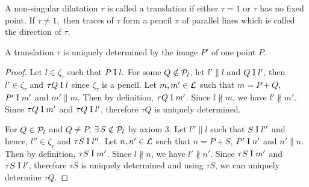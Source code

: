 \begin{definition}
    A non-singular dilatation $\tau$ is called a translation if either $\tau = 1$ or $\tau$ has no fixed point. If $\tau \neq 1,$ then traces of $\tau$ form a pencil $\pi$ of parallel lines which is called the direction of $\tau.$
\end{definition}

\begin{theorem}
    A translation $\tau$ is uniquely determined by the image $P'$ of one point $P.$
\end{theorem}

\begin{proof}
    Let $l \in \zeta_\tau$ such that $P \mathrel\text{I} l.$ For some $Q \notin \mathcal{P}_l$, let $l' \parallel l$ and $Q \mathrel\text{I} l'$, then $l' \in \zeta_\tau$ and $\tau Q \mathrel\text{I} l$ since $\zeta_\tau$ is a pencil.  Let $m,m' \in \mathcal{L}$ such that $m=P+Q$, $P' \mathrel\text{I} m'$ and $m' \parallel m$. Then by definition, $ \tau Q \mathrel\text{I} m'$. Since $l \not \parallel m$, we have $l' \not \parallel m'$. Since $\tau Q \mathrel\text{I} m'$ and $\tau Q \mathrel\text{I} l'$, therefore $\tau Q$ is uniquely determined.

    \vspace{1ex}

    For $Q \in \mathcal{P}_l$ and $Q \neq P$, $\exists\, S \notin \mathcal{P}_{l}$ by axiom 3. Let $l'' \parallel l$ such that $S \mathrel\text{I} l''$ and hence, $l'' \in \zeta_\tau$ and $\tau S \mathrel\text{I} l''$.  Let $n,n' \in \mathcal{L}$ such that $n=P+S$, $P' \mathrel\text{I} n'$ and $n' \parallel n$. Then by definition, $ \tau S \mathrel\text{I} m'$. Since $l \not \parallel n$, we have $l' \not \parallel n'$. Since $\tau S \mathrel\text{I} m'$ and $\tau S \mathrel\text{I} l'$, therefore $\tau S$ is uniquely determined and using $\tau S$, we can uniquely determine $\tau Q$.
\end{proof}


